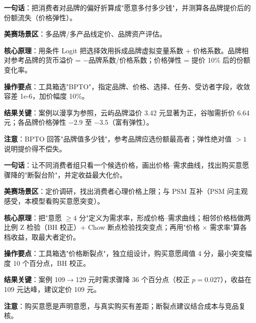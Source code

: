 \begin{algobrief}
\textbf{一句话}：把消费者对品牌的偏好折算成"愿意多付多少钱"，并测算各品牌提价后的份额流失（价格弹性）。

\textbf{美赛场景区}：多品牌/多产品线定价、品牌资产评估。

\textbf{核心原理}：用条件 Logit 把选择效用拆成品牌虚拟变量系数 + 价格系数。品牌相对参考品牌的货币溢价 = $-$品牌系数/价格系数；价格弹性 = 提价 10\% 后的份额变化率。

\textbf{操作要点}：工具箱选"BPTO"，指定品牌、价格、选择、任务、受访者字段，收敛容差 1e-6，加价幅度 10\%。

\textbf{结果关键}：案例以漫享为参照，云屿品牌溢价 3.42 元显著为正，谷咖需折价 6.64 元；各品牌价格弹性 $-2.9$ 至 $-3.5$（富有弹性）。

\textbf{注意}：BPTO 回答"品牌值多少钱"，参考品牌应选份额最高者；弹性绝对值 $>1$ 说明提价得不偿失。
\end{algobrief}


\begin{algobrief}
\textbf{一句话}：让不同消费者组只看一个候选价格，画出价格--需求曲线，找出购买意愿骤降的"断裂台阶"，并定收益最大化价。

\textbf{美赛场景区}：定价调研，找出消费者心理价格上限；与 PSM 互补（PSM 问主观感受，本模型看购买意愿突变）。

\textbf{核心原理}：把"意愿 $\geq 4$ 分"定义为需求率，形成价格--需求曲线；相邻价格档做两比例 Z 检验（BH 校正）+ Chow 断点检验找突变点；再用"价格 $\times$ 需求率"算各档收益，取最大者定价。

\textbf{操作要点}：工具箱选"价格断裂点"，独立组设计，购买意愿阈值 4 分，最小突变幅度 10 个百分点，BH 校正。

\textbf{结果关键}：案例 109$\to$129 元时需求骤降 36 个百分点（校正 $p=0.027$），收益在 109 元达峰，建议定价 109 元。

\textbf{注意}：购买意愿是声明意愿，与真实购买有差距；断裂点建议结合成本与竞品复核。
\end{algobrief}
